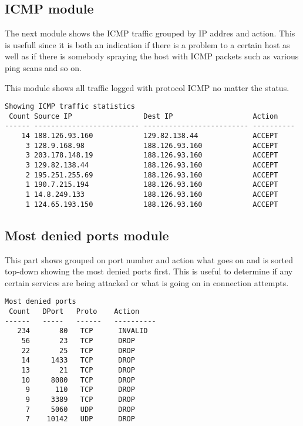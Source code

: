 \documentclass[english,twoside,openright,a4paper,12pt]{article}
\begin{document}
\subsection{ICMP module}

The next module shows the ICMP traffic grouped by IP addres and
action. This is usefull since it is both an indication if there is a
problem to a certain host as well as if there is somebody spraying the
host with ICMP packets such as various ping scans and so on.

This module shows all traffic logged with protocol ICMP no matter the
status.

\scriptsize \begin{verbatim}
Showing ICMP traffic statistics
 Count Source IP                 Dest IP                   Action    
------ ------------------------- ------------------------- ----------
    14 188.126.93.160            129.82.138.44             ACCEPT    
     3 128.9.168.98              188.126.93.160            ACCEPT    
     3 203.178.148.19            188.126.93.160            ACCEPT    
     3 129.82.138.44             188.126.93.160            ACCEPT    
     2 195.251.255.69            188.126.93.160            ACCEPT    
     1 190.7.215.194             188.126.93.160            ACCEPT    
     1 14.8.249.133              188.126.93.160            ACCEPT    
     1 124.65.193.150            188.126.93.160            ACCEPT    
\end{verbatim} 
\normalsize

\subsection{Most denied ports module}

This part shows grouped on port number and action what goes on and is
sorted top-down showing the most denied ports first. This is useful to
determine if any certain services are being attacked or what is going
on in connection attempts.

\scriptsize 
\begin{verbatim}
Most denied ports
 Count   DPort   Proto    Action       
------   -----   ------   ----------   
   234       80   TCP      INVALID   
    56       23   TCP      DROP      
    22       25   TCP      DROP      
    14     1433   TCP      DROP      
    13       21   TCP      DROP      
    10     8080   TCP      DROP      
     9      110   TCP      DROP      
     9     3389   TCP      DROP      
     7     5060   UDP      DROP      
     7    10142   UDP      DROP      
\end{verbatim} 
\normalsize
\end{document}
